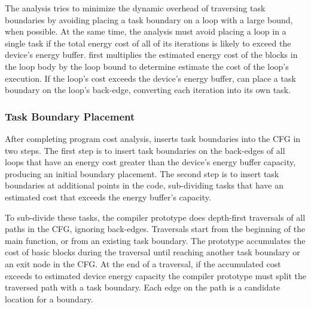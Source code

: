 
The analysis tries to minimize the dynamic overhead of traversing task
boundaries by avoiding placing a task boundary on a loop with a large bound,
when possible. At the same time, the analysis must avoid placing a loop in a
single task if the total energy cost of all of its iterations is likely to
exceed the device's energy buffer. \sys first multiplies the estimated energy
cost of the blocks in the loop body by the loop bound to determine estimate the
cost of the loop's execution. If the loop's cost exceeds the device's energy
buffer, \sys can place a task boundary on the loop's back-edge, converting each
iteration into its own task.  



\subsubsection{Task Boundary Placement}
\label{sec:compiler_boundary}

After completing program cost analysis, \sys inserts task boundaries into the
CFG in two steps. The first step is to insert task boundaries on the back-edges
of all loops that have an energy cost greater than the device's energy buffer
capacity, producing an initial boundary placement. The second step is to insert
task boundaries at additional points in the code, sub-dividing tasks that have
an estimated cost that exceeds the energy buffer's capacity.

To sub-divide these tasks, the compiler prototype does depth-first traversals
of all paths in the CFG, ignoring back-edges. Traversals start from the
beginning of the main function, or from an existing task boundary. The
prototype accumulates the cost of basic blocks during the traversal until
reaching another task boundary or an exit node in the CFG. At the end of a
traversal, if the accumulated cost exceeds to estimated device energy capacity the
compiler prototype must split the traversed path with a task boundary. Each
edge on the path is a candidate location for a boundary.

